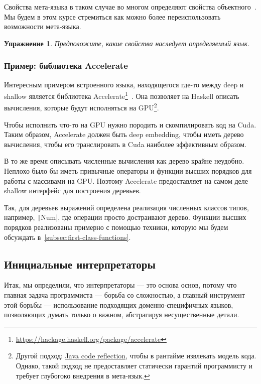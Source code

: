 \documentclass[12pt]{article}
\newtheorem{task}{Упражнение}
\begin{document}
    Свойства мета-языка в таком случае во многом определяют свойства объектного~\cite{reynolds1972definitional,reynolds1998definitional}.
    Мы будем в этом курсе стремиться как можно более переиспользовать возможности мета-языка.

    \begin{task}
        Предположите, какие свойства наследует определяемый язык.
    \end{task}

    \subsubsection{Пример: библиотека Accelerate}

    Интересным примером встроенного языка, находящегося где-то между deep и shallow является библиотека Accelerate\footnote{\url{https://hackage.haskell.org/package/accelerate}}~\cite[chapter 6]{marlow2011parallel}.
    Она позволяет на Haskell описать вычисления, которые будут исполняться на GPU\footnote{Другой подход: \href{https://youtu.be/6c0DB2kwF_Q?si=-nB7AkCsDWB_Q-hy}{Java code reflection}, чтобы в рантайме извлекать модель кода. Однако, такой подход не предоставляет статически гарантий программисту и требует глубогоко внедрения в мета-язык.}.

    Чтобы исполнить что-то на GPU нужно породить и скомпилировать код на Cuda.
    Таким образом, Accelerate должен быть deep embedding, чтобы иметь дерево вычисления, чтобы его транслировать в Cuda наиболее эффективным образом.

    В то же время описывать численные вычисления как дерево крайне неудобно.
    Неплохо было бы иметь привычные операторы и функции высших порядков для работы с массивами на GPU\@.
    Поэтому Accelerate предоставляет на самом деле shallow интерфейс для построения деревьев.

    Так, для деревьев выражений определена реализация численных классов типов, например, \texttt|Num|, где операции просто достраивают дерево.
    Функции высших порядков реализованы примерно с помощью техники, которую мы будем обсуждать в~\ref{subsec:first-class-functions}.


    \subsection{Инициальные интерпретаторы}

    Итак, мы определили, что интерпретаторы --- это основа основ, потому что главная задача программиста --- борьба со сложностью, а главный инструмент этой борьбы --- использование подходящих доменно-специфичных языков, позволяющих думать только о важном, абстрагируя несущественные детали.
\end{document}
